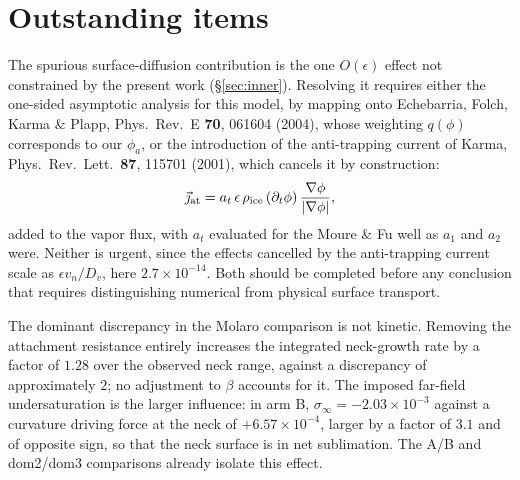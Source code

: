 \section{Outstanding items}\label{sec:open}

The spurious surface-diffusion contribution is the one $O(\epsilon)$ effect not constrained
by the present work (\S\ref{sec:inner}). Resolving it requires either the one-sided
asymptotic analysis for this model, by mapping onto Echebarria, Folch, Karma \& Plapp,
Phys.\ Rev.\ E \textbf{70}, 061604 (2004), whose weighting $q(\phi)$ corresponds to our
$\phi_a$, or the introduction of the anti-trapping current of Karma, Phys.\ Rev.\ Lett.\
\textbf{87}, 115701 (2001), which cancels it by construction:
\begin{equation}
\vec{\jmath}_{\rm at}=a_t\,\epsilon\,\rho_{\rm ice}\,(\partial_t\phi)\,
\frac{\nabla\phi}{|\nabla\phi|},
\end{equation}
added to the vapor flux, with $a_t$ evaluated for the Moure \& Fu well as $a_1$ and $a_2$
were. Neither is urgent, since the effects cancelled by the anti-trapping current scale as
$\epsilon v_n/D_v$, here $2.7\times10^{-14}$. Both should be completed before any
conclusion that requires distinguishing numerical from physical surface transport.

The dominant discrepancy in the Molaro comparison is not kinetic. Removing the attachment
resistance entirely increases the integrated neck-growth rate by a factor of $1.28$ over
the observed neck range, against a discrepancy of approximately $2$; no adjustment to
$\beta$ accounts for it. The imposed far-field undersaturation is the larger influence: in
arm B, $\sigma_\infty=-2.03\times10^{-3}$ against a curvature driving force at the neck of
$+6.57\times10^{-4}$, larger by a factor of $3.1$ and of opposite sign, so that the neck
surface is in net sublimation. The A/B and dom2/dom3 comparisons already isolate this
effect.
